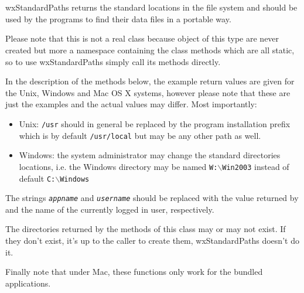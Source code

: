 
\section{}\label{wxstandardsaths}

wxStandardPaths returns the standard locations in the file system and should be
used by the programs to find their data files in a portable way.

Please note that this is not a real class because object of this type are never
created but more a namespace containing the class methods which are all static,
so to use wxStandardPaths simply call its methods directly.

In the description of the methods below, the example return values are given
for the Unix, Windows and Mac OS X systems, however please note that these are
just the examples and the actual values may differ. Most importantly:
\begin{itemize}
    \item Unix: \texttt{/usr} should in general be replaced by the
        program installation prefix which is by default \texttt{/usr/local} but
        may be any other path as well.
    \item Windows: the system administrator may change the standard
        directories locations, i.e. the Windows directory may be named
        \texttt{W:$\backslash$Win2003} instead of default
        \texttt{C:$\backslash$Windows}
\end{itemize}

The strings \texttt{\textit{appname}} and \texttt{\textit{username}} should be
replaced with the value returned by  
and the name of the currently logged in user, respectively.

The directories returned by the methods of this class may or may not exist. If
they don't exist, it's up to the caller to create them, wxStandardPaths doesn't
do it.

Finally note that under Mac, these functions only work for the bundled
applications.

